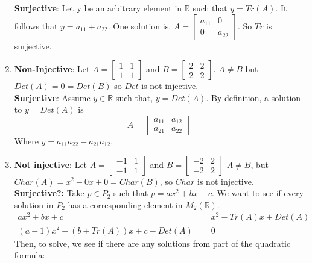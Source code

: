 \documentclass{article}
\theoremstyle{problem}
\theoremstyle{plain}
\theoremstyle{remark}
\begin{document}
\begin{enumerate}
      \textbf{Surjective}: Let y be an arbitrary element in $\mathbb{R}$ such that $y = Tr(A)$. It follows that $y = a_{11} + a_{22}$. One solution is, $A = 
      \begin{bmatrix}
        a_{11} & 0\\
        0 & a_{22}
      \end{bmatrix}$. So $Tr$ is surjective. 

    \item \textbf{Non-Injective}: Let $A = 
      \begin{bmatrix}
        1 & 1\\
        1 & 1
      \end{bmatrix}$
      and $B =
      \begin{bmatrix}
        2 & 2\\
        2 & 2
      \end{bmatrix}$. $A \not = B$ but $Det(A) = 0 = Det(B)$ so $Det$ is not injective.\\
      \textbf{Surjective}: Assume $y \in \mathbb{R}$ such that, $y = Det(A)$. By definition, a solution to $y = Det(A)$ is 
      $$A = 
      \begin{bmatrix}
        a_{11} & a_{12}\\
        a_{21} & a_{22}
      \end{bmatrix}$$
Where $y = a_{11}a_{22} - a_{21}a_{12}$.
    \item \textbf{Not injective}: Let $A = 
      \begin{bmatrix}
        -1 & 1\\
        -1 & 1
      \end{bmatrix}$ and $B = 
      \begin{bmatrix}
        -2 & 2\\
        -2 & 2
      \end{bmatrix}$ $A \not = B$, but $Char(A) = x^2 - 0x + 0 = Char(B)$, so $Char$ is not injective.\\      
           \textbf{Surjective?:} Take $p \in P_2$ such that $p = ax^2 + bx + c$. We want to see if every solution in $P_2$ has a corresponding element in $M_2(\mathbb{R})$.
           \begin{align*}
             ax^2 + bx + c &= x^2 - Tr(A)x + Det(A)\\
             (a-1)x^2 + (b+Tr(A))x + c - Det(A) &= 0             
           \end{align*}
           Then, to solve, we see if there are any solutions from part of the quadratic formula:

\end{enumerate}
\end{document}
